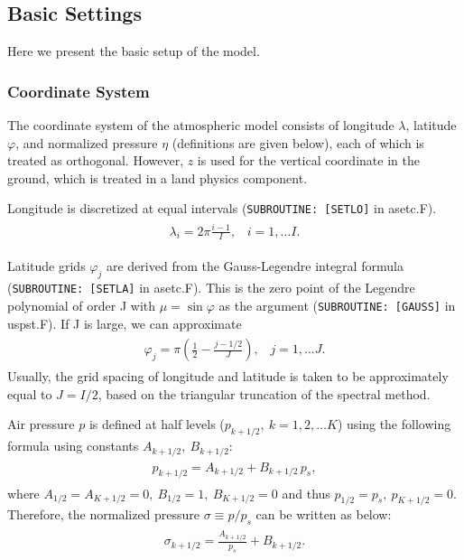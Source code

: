 \hypertarget{basic-settings}{%
\subsection{Basic Settings}\label{basic-settings}}

Here we present the basic setup of the model.

\hypertarget{coordinate-system}{%
\subsubsection{Coordinate System}\label{coordinate-system}}

The coordinate system of the atmospheric model consists of longitude \(\lambda\), latitude \(\varphi\), and normalized pressure \(\eta\) (definitions are given below), each of which is treated as
orthogonal. However, \(z\) is used for the vertical coordinate in the ground, which is treated in a land physics component.

Longitude is discretized at equal intervals (\texttt{SUBROUTINE:~{[}SETLO{]}} in asetc.F). \begin{eqnarray}\begin{aligned}
  \lambda_i = 2 \pi \frac{i-1}{I},  \;\;\; i = 1, \ldots I.\end{aligned}\end{eqnarray}

Latitude grids \(\varphi_j\) are derived from the Gauss-Legendre integral formula (\texttt{SUBROUTINE:~{[}SETLA{]}} in asetc.F). This is the zero point of the Legendre polynomial of order J with
\(\mu = \sin \varphi\) as the argument (\texttt{SUBROUTINE:~{[}GAUSS{]}} in uspst.F). If J is large, we can approximate \begin{eqnarray}\begin{aligned}
  \varphi_j =  \pi \left( \frac{1}{2}- \frac{j-1/2}{J} \right), \;\;\; j = 1, \ldots J.\end{aligned}\end{eqnarray} Usually, the grid spacing of longitude and latitude is taken to be approximately equal to
\(J = I/2\), based on the triangular truncation of the spectral method.

Air pressure \(p\) is defined at half levels (\(p_{k+1/2},\ k = 1, 2, \ldots K\)) using the following formula using constants \(A_{k+1/2},\ B_{k+1/2}\): \begin{eqnarray}
\begin{aligned}
p_{k+1/2} = A_{k+1/2} +B_{k+1/2}\,p_s,\end{aligned}\end{eqnarray} where \(A_{1/2}=A_{K+1/2}=0,\ B_{1/2}=1,\ B_{K+1/2}=0\) and thus \(p_{1/2}=p_s,\ p_{K+1/2}=0\). Therefore, the normalized pressure
\(\sigma\equiv p/p_s\) can be written as below: \begin{eqnarray}\begin{aligned}
\sigma_{k+1/2} = \frac{A_{k+1/2}}{p_s} +B_{k+1/2}.\end{aligned}\end{eqnarray}

